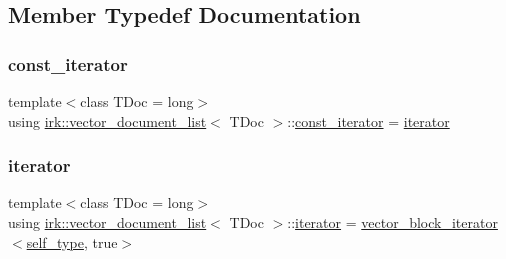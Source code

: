 \subsection{Member Typedef Documentation}
\mbox{\label{classirk_1_1vector__document__list_a91539ec8ebd87cd47957107df90744aa}} 
\subsubsection{\texorpdfstring{const\+\_\+iterator}{const\_iterator}}
{\footnotesize\ttfamily template$<$class T\+Doc  = long$>$ \\
using \mbox{\hyperlink{classirk_1_1vector__document__list}{irk\+::vector\+\_\+document\+\_\+list}}$<$ T\+Doc $>$\+::\mbox{\hyperlink{classirk_1_1vector__document__list_a91539ec8ebd87cd47957107df90744aa}{const\+\_\+iterator}} =  \mbox{\hyperlink{classirk_1_1vector__document__list_a42499af78a7d66a1b626858cd424600f}{iterator}}}

\mbox{\label{classirk_1_1vector__document__list_a42499af78a7d66a1b626858cd424600f}} 
\subsubsection{\texorpdfstring{iterator}{iterator}}
{\footnotesize\ttfamily template$<$class T\+Doc  = long$>$ \\
using \mbox{\hyperlink{classirk_1_1vector__document__list}{irk\+::vector\+\_\+document\+\_\+list}}$<$ T\+Doc $>$\+::\mbox{\hyperlink{classirk_1_1vector__document__list_a42499af78a7d66a1b626858cd424600f}{iterator}} =  \mbox{\hyperlink{classirk_1_1vector__block__iterator}{vector\+\_\+block\+\_\+iterator}}$<$\mbox{\hyperlink{classirk_1_1vector__document__list_a8c83c7819e9ffcbb4162d3ee9f41d76a}{self\+\_\+type}}, true$>$}

\mbox{\label{classirk_1_1vector__document__list_a8c83c7819e9ffcbb4162d3ee9f41d76a}} 
